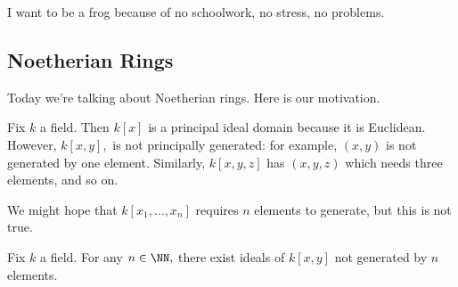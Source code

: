 












I want to be a frog because of no schoolwork, no stress, no problems.

\subsection{Noetherian Rings}
Today we're talking about Noetherian rings. Here is our motivation.
\begin{example}
	Fix $k$ a field. Then $k[x]$ is a principal ideal domain because it is Euclidean. However, $k[x,y],$ is not principally generated: for example, $(x,y)$ is not generated by one element. Similarly, $k[x,y,z]$ has $(x,y,z)$ which needs three elements, and so on.
\end{example}
We might hope that $k[x_1,\ldots,x_n]$ requires $n$ elements to generate, but this is not true.
\begin{exercise}
	Fix $k$ a field. For any $n\in\NN,$ there exist ideals of $k[x,y]$ not generated by $n$ elements.
\end{exercise}
